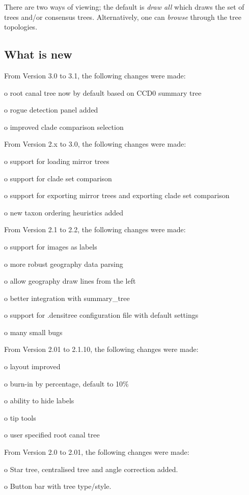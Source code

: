\documentclass{article}
\begin{document}
There are two ways of viewing; the default is {\em draw all} which draws the set 
of trees and/or consensus trees. Alternatively, one can {\em browse} through the
tree topologies.

\subsection{What is new \label{ssec.new}}


\noindent From Version 3.0 to 3.1, the following changes were made:

o root canal tree now by default based on CCD0 summary tree \cite{CCD}

o rogue detection panel added \cite{rogues}

o improved clade comparison selection

\noindent From Version 2.x to 3.0, the following changes were made:

o support for loading mirror trees

o support for clade set comparison

o support for exporting mirror trees and exporting clade set comparison

o new taxon ordering heuristics added

\noindent From Version 2.1 to 2.2, the following changes were made:

o support for images as labels

o more robust geography data parsing

o allow geography draw lines from the left

o better integration with summary\_tree

o support for .densitree configuration file with default settings

o many small bugs

\noindent From Version 2.01 to 2.1.10, the following changes were made:

o layout improved

o burn-in by percentage, default to 10\%

o ability to hide labels

o tip tools

o user specified root canal tree

\noindent From Version 2.0 to 2.01, the following changes were made:

o Star tree, centralised tree and angle correction added.

o Button bar with tree type/style.
\end{document}
